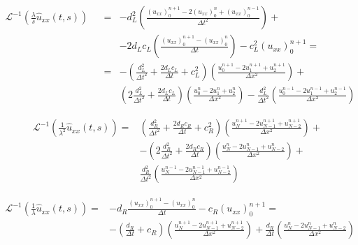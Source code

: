  \begin{equation}
     \label{eq:FDorder2B}
    \begin{aligned}
    \mathcal{L}^{-1} \left( \frac{\lambda}{s} \hat{u}_{xx}(t,s) \right) && = &  -d_L^2 \left( \frac{(u_{xx})_0^{n+1} - 2(u_{xx})_0^{n} + (u_{xx})_0^{n-1}}{\Delta t^2} \right) + \\
    			&&  &  - 2d_Lc_L \left( \frac{(u_{xx})_0^{n+1} - (u_{xx})_0^{n}}{\Delta t} \right) - c_L^2 (u_{xx})_0^{n+1} = \\
    			&&  = & -\left( \frac{d_L^2}{\Delta t^2} + \frac{2d_Lc_L}{\Delta t} + c_L^2  \right) \left(  \frac{u_0^{n+1} - 2u_1^{n+1} + u_2^{n+1}}{\Delta x^2} \right) + \\
    			&& &  \left( 2\frac{d_L^2}{\Delta t^2} + \frac{2d_Lc_L}{\Delta t}\right) \left(  \frac{u_0^{n} - 2u_1^n + u_2^{n}}{\Delta x^2} \right) - \frac{d_L^2}{\Delta t^2} \left(  \frac{u_0^{n-1} - 2u_1^{n-1} + u_2^{n-1}}{\Delta x^2} \right)
    \end{aligned}
 \end{equation}
     			
\begin{equation}
     \label{eq:FDorder2C}
         \begin{aligned}
    \mathcal{L}^{-1} \left( \frac{1}{\lambda^2} \hat{u}_{xx}(t,s) \right) = & \left( \frac{d_R^2}{\Delta t^2} + \frac{2d_Rc_R}{\Delta t} + c_R^2  \right) \left(  \frac{u_{N}^{n+1} - 2u_{N-1}^{n+1} + u_{N-2}^{n+1}}{\Delta x^2} \right) + \\
    			& - \left( 2\frac{d_R^2}{\Delta t^2} + \frac{2d_Rc_R}{\Delta t}\right) \left(  \frac{u_N^{n} - 2u_{N-1}^n + u_{N-2}^{n}}{\Delta x^2} \right) + \\
    			& \frac{d_R^2}{\Delta t^2} \left(  \frac{u_N^{n-1} - 2u_{N-1}^{n-1} + u_{N-2}^{n-1}}{\Delta x^2} \right)
    \end{aligned}
 \end{equation}
     			
\begin{equation}
     \label{eq:FDorder2D}
         \begin{aligned}
    \mathcal{L}^{-1} \left( \frac{1}{\lambda} \hat{u}_{xx}(t,s) \right) = & -d_R \frac{ (u_{xx})_0^{n+1} - (u_{xx})_0^n}{\Delta t} - c_R (u_{xx})_0^{n+1} =\\
    			& -\left( \frac{d_R}{\Delta t} + c_R \right) \left( \frac{u_N^{n+1} -2 u_{N-1}^{n+1} + u_{N-2}^{n+1}}{\Delta x^2}\right) + \frac{d_R}{\Delta t}\left( \frac{u_{N}^{n} - 2u_{N-1}^{n} + u_{N-2}^n}{\Delta x^2}\right)
    \end{aligned}
\end{equation}

